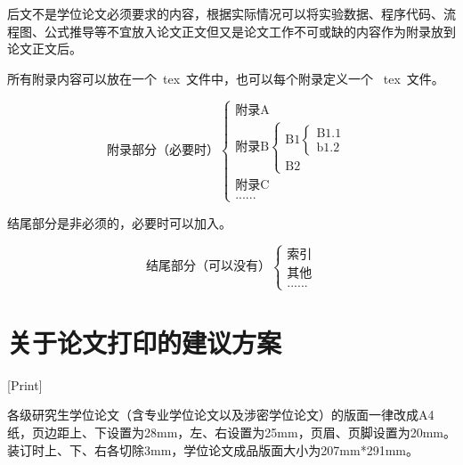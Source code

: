 后文不是学位论文必须要求的内容，根据实际情况可以将实验数据、程序代码、流程图、公式推导等不宜放入论文正文但又是论文工作不可或缺的内容作为附录放到论文正文后。

所有附录内容可以放在一个~tex~文件中，也可以每个附录定义一个 ~tex~文件。

\[
    \text{附录部分（必要时）}
    \begin{cases}
        \text{附录A}               \\
        \text{附录B}
        \begin{cases}
            \text{B1}
            \begin{cases}
                \text{B1.1} \\
                \text{b1.2}
            \end{cases} \\
            \text{B2}
        \end{cases} \\
        \text{附录C}               \\
        \text{......}
    \end{cases}
\]

结尾部分是非必须的，必要时可以加入。

\[
    \text{结尾部分（可以没有）}
    \begin{cases}
        \text{索引} \\
        \text{其他} \\
        \text{......}
    \end{cases}
\]

\chapter{关于论文打印的建议方案}[Print]

各级研究生学位论文（含专业学位论文以及涉密学位论文）的版面一律改成A4纸，页边距上、下设置为28mm，左、右设置为25mm，页眉、页脚设置为20mm。装订时上、下、右各切除3mm，学位论文成品版面大小为207mm*291mm。

